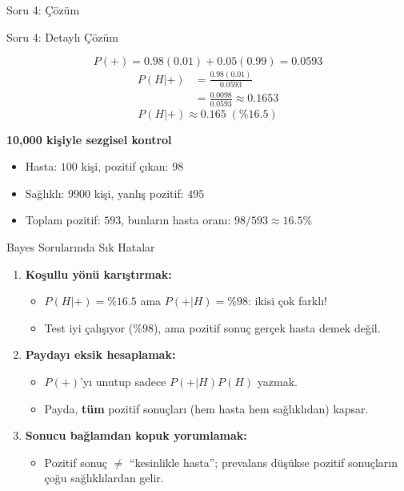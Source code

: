 \documentclass[light]{lutbeamer}
\begin{document}
\begin{frame}{Soru 4: Çözüm}
    \vspace{5cm}
\end{frame}

\begin{frame}[allowframebreaks]{Soru 4: Detaylı Çözüm}
    \large
    {\color{red}
    \[
    P(+)=0.98(0.01)+0.05(0.99)=0.0593
    \]
    \begin{align*}
    P(H|+) &= \frac{0.98(0.01)}{0.0593} \\
           &= \frac{0.0098}{0.0593}\approx 0.1653
    \end{align*}
    \[
    \boxed{P(H|+)\approx 0.165\;(\%16.5)}
    \]

    \framebreak
    \textbf{10,000 kişiyle sezgisel kontrol}
    \begin{itemize}
        \item Hasta: \(100\) kişi, pozitif çıkan: \(98\)
        \item Sağlıklı: \(9900\) kişi, yanlış pozitif: \(495\)
        \item Toplam pozitif: \(593\), bunların hasta oranı: \(98/593\approx 16.5\%\)
    \end{itemize}
    }
\end{frame}

\begin{frame}{Bayes Sorularında Sık Hatalar}
    \begin{enumerate}
        \item \textbf{Koşullu yönü karıştırmak:}
        \begin{itemize}
            \item $P(H|+)=\%16.5$ ama $P(+|H)=\%98$: ikisi çok farklı!
            \item Test iyi çalışıyor ($\%98$), ama pozitif sonuç gerçek hasta demek değil.
        \end{itemize}
        \item \textbf{Paydayı eksik hesaplamak:}
        \begin{itemize}
            \item $P(+)$'yı unutup sadece $P(+|H)P(H)$ yazmak.
            \item Payda, \textbf{tüm} pozitif sonuçları (hem hasta hem sağlıklıdan) kapsar.
        \end{itemize}
        \item \textbf{Sonucu bağlamdan kopuk yorumlamak:}
        \begin{itemize}
            \item Pozitif sonuç $\neq$ ``kesinlikle hasta''; prevalans düşükse pozitif sonuçların çoğu sağlıklılardan gelir.
        \end{itemize}
    \end{enumerate}
\end{frame}
\end{document}
